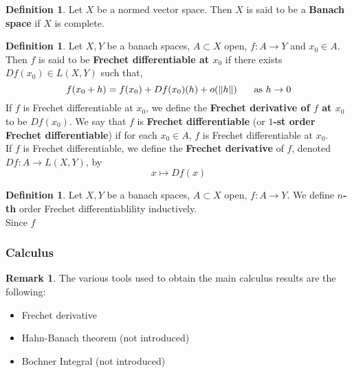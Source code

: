 \documentclass[notheorems]{beamer}
\theoremstyle{definition}
\newtheorem{defn}[definition]{Definition}
\theoremstyle{definition}
\newtheorem{rem}[definition]{Remark}
\begin{document}
\begin{frame}

	\begin{defn}
		Let $X$ be a normed vector space. Then $X$ is said to be a \textbf{Banach space} if $X$ is complete.  
	\end{defn}

	\begin{defn}
	Let $X, Y$ be a banach spaces, $A \subset X$ open, $f:A \rightarrow Y$ and $x_0 \in A$. Then $f$ is said to be \textbf{Frechet differentiable at $x_0$} if there exists $Df(x_0) \in L(X,Y)$ such that, $$f(x_0 + h) = f(x_0) + Df(x_0)(h) + o(\|h\| ) \hspace{.5cm} \text{ as } h \rightarrow 0$$  
	If $f$ is Frechet differentiable at $x_0$, we define the \textbf{Frechet derivative of $f$ at $x_0$} to be $Df(x_0)$.
	We say that $f$ is \textbf{Frechet differentiable} (or \textbf{$1$-st order Frechet differentiable}) if for each $x_0 \in A$, $f$ is Frechet differentiable at $x_0$. \\
	If $f$ is Frechet differentiable, we define the \textbf{Frechet derivative} of $f$, denoted $Df: A \rightarrow L(X,Y)$, by $$x \mapsto Df(x)$$
	\end{defn}

\end{frame}











\begin{frame}
\begin{defn}
Let $X, Y$ be a banach spaces, $A \subset X$ open, $f:A \rightarrow Y$. We define \textbf{$n$-th} order Frechet differentiablility inductively. \\
Since $f$  
\end{defn}
\end{frame}













\begin{frame}
\frametitle{Calculus}

\begin{rem}
The various tools used to obtain the main calculus results are the following:
	\begin{itemize}
	\item Frechet derivative 
	\item Hahn-Banach theorem (not introduced)
	\item Bochner Integral (not introduced)
	\end{itemize}
\end{rem}
\end{frame}
\end{document}

